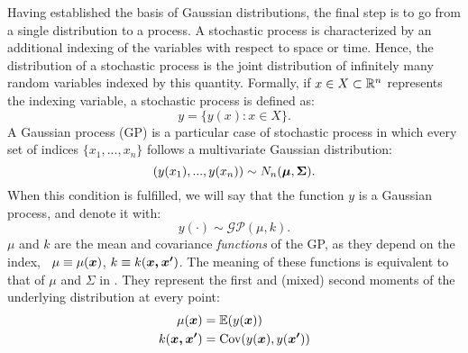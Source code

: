 
Having established the basis of Gaussian distributions, the final step is to go from a single distribution to a process. A stochastic process is characterized by an additional indexing of the variables with respect to space or time. Hence, the distribution of a stochastic process is the joint distribution of infinitely many random variables indexed by this quantity. Formally, if $x \in X \subset \mathbb{R}^n$ represents the indexing variable, a stochastic process is defined as:
\begin{equation*}
    y = \{ y(x) : x\in X\}.
\end{equation*}
A Gaussian process (GP) is a particular case of stochastic process in which every set of indices $\{x_1,...,x_n\}$ follows a multivariate Gaussian distribution:
\begin{equation}
    (y(x_1), ..., y(x_n)) \sim N_n(\boldsymbol{\mu}, \boldsymbol{\Sigma}).
    \label{eq:gp_prior}
\end{equation}
When this condition is fulfilled, we will say that the function $y$ is a Gaussian process, and denote it with:
\begin{equation*}
    y(\cdot)\sim\mathcal{GP}(\mu, k).
\end{equation*}
$\mu$ and $k$ are the mean and covariance \textit{functions} of the GP, as they depend on the index, \ie~$\mu \equiv \mu(\boldsymbol{x})$, $k \equiv k(\boldsymbol{x, x'})$. The meaning of these functions is equivalent to that of $\mu$ and $\Sigma$ in . They represent the first and (mixed) second moments of the underlying distribution at every point:
\begin{align*}
    \mu(\boldsymbol{x}) &= \mathbb{E}(y(\boldsymbol{x}))  \\
    k(\boldsymbol{x, x'}) &= \text{Cov}(y(\boldsymbol{x}), y(\boldsymbol{x'}))  \\
\end{align*}


